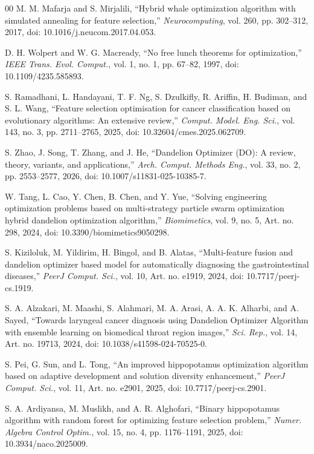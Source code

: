\documentclass[journal]{IEEEtran}
\begin{document}
\begin{thebibliography}{00}
 M. M. Mafarja and S. Mirjalili, ``Hybrid whale optimization algorithm with simulated annealing for feature selection,'' \textit{Neurocomputing}, vol. 260, pp. 302--312, 2017, doi: 10.1016/j.neucom.2017.04.053.

 D. H. Wolpert and W. G. Macready, ``No free lunch theorems for optimization,'' \textit{IEEE Trans. Evol. Comput.}, vol. 1, no. 1, pp. 67--82, 1997, doi: 10.1109/4235.585893.

 S. Ramadhani, L. Handayani, T. F. Ng, S. Dzulkifly, R. Ariffin, H. Budiman, and S. L. Wang, ``Feature selection optimisation for cancer classification based on evolutionary algorithms: An extensive review,'' \textit{Comput. Model. Eng. Sci.}, vol. 143, no. 3, pp. 2711--2765, 2025, doi: 10.32604/cmes.2025.062709.

 S. Zhao, J. Song, T. Zhang, and J. He, ``Dandelion Optimizer (DO): A review, theory, variants, and applications,'' \textit{Arch. Comput. Methods Eng.}, vol. 33, no. 2, pp. 2553--2577, 2026, doi: 10.1007/s11831-025-10385-7.

 W. Tang, L. Cao, Y. Chen, B. Chen, and Y. Yue, ``Solving engineering optimization problems based on multi-strategy particle swarm optimization hybrid dandelion optimization algorithm,'' \textit{Biomimetics}, vol. 9, no. 5, Art. no. 298, 2024, doi: 10.3390/biomimetics9050298.

 S. Kiziloluk, M. Yildirim, H. Bingol, and B. Alatas, ``Multi-feature fusion and dandelion optimizer based model for automatically diagnosing the gastrointestinal diseases,'' \textit{PeerJ Comput. Sci.}, vol. 10, Art. no. e1919, 2024, doi: 10.7717/peerj-cs.1919.

 S. A. Alzakari, M. Maashi, S. Alahmari, M. A. Arasi, A. A. K. Alharbi, and A. Sayed, ``Towards laryngeal cancer diagnosis using Dandelion Optimizer Algorithm with ensemble learning on biomedical throat region images,'' \textit{Sci. Rep.}, vol. 14, Art. no. 19713, 2024, doi: 10.1038/s41598-024-70525-0.

 S. Pei, G. Sun, and L. Tong, ``An improved hippopotamus optimization algorithm based on adaptive development and solution diversity enhancement,'' \textit{PeerJ Comput. Sci.}, vol. 11, Art. no. e2901, 2025, doi: 10.7717/peerj-cs.2901.

 S. A. Ardiyansa, M. Muslikh, and A. R. Alghofari, ``Binary hippopotamus algorithm with random forest for optimizing feature selection problem,'' \textit{Numer. Algebra Control Optim.}, vol. 15, no. 4, pp. 1176--1191, 2025, doi: 10.3934/naco.2025009.


\end{thebibliography}
\end{document}
